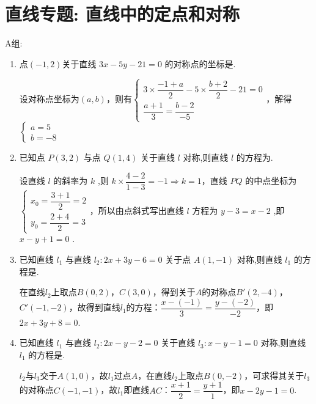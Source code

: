 \section*{直线专题: 直线中的定点和对称}

A组:

\begin{enumerate}
    \item 点$(-1,2)$关于直线 ${3x} - {5y} - {21} = 0$ 的对称点的坐标是.
    \begin{jieda}
        设对称点坐标为$(a, b)$，则有$\left\{\begin{array}{l}
             3 \times \dfrac{-1+a}{2} - 5 \times \dfrac{b+2}{2} - {21} = 0 \\
             \dfrac{a+1}{3} = \dfrac{b-2}{-5}
        \end{array}\right.$，解得$\left\{\begin{array}{l}
             a = 5  \\
             b = -8
        \end{array}\right.$
    \end{jieda}
    
    \item 已知点 $P\left( {3,2}\right)$ 与点 $Q\left( {1,4}\right)$ 关于直线 $l$ 对称,则直线 $l$ 的方程为.
    \begin{jieda}
        设直线 $l$ 的斜率为 $k$ ,则 $k \times  \dfrac{4 - 2}{1 - 3} =  - 1 \Longrightarrow  k = 1$，直线 ${PQ}$ 的中点坐标为 $\left\{  \begin{array}{l} {x}_{0} = \dfrac{3 + 1}{2} = 2 \\  {y}_{0} = \dfrac{2 + 4}{2} = 3 \end{array}\right.$，所以由点斜式写出直线 $l$ 方程为 $y - 3 = x - 2$ ,即 $x - y + 1 = 0$ .
    \end{jieda}
    
    \item 已知直线 ${l}_{1}$ 与直线 ${l}_{2} : {2x} + {3y} - 6 = 0$ 关于点 $A\left( {1, - 1}\right)$ 对称,则直线 ${l}_{1}$ 的方程是.
    \begin{jieda}
        在直线$l_2$上取点$B(0,2)$，$C(3, 0)$，得到关于$A$的对称点$B'(2, -4)$，$C'(-1, -2)$，故得到直线$l_1$的方程：$\dfrac{x-(-1)}{3} = \dfrac{y-(-2)}{-2}$，即$2x+3y+8=0$.
    \end{jieda}
    
    \item 已知直线 ${l}_{1}$ 与直线 ${l}_{2} : {2x} - y - 2 = 0$ 关于直线 ${l}_{3} : x - y - 1 = 0$ 对称,则直线 ${l}_{1}$ 的方程是.
    \begin{jieda}
        $l_2$与$l_3$交于$A(1, 0)$，故$l_1$过点$A$，在直线$l_2$上取点$B(0, -2)$，可求得其关于$l_3$的对称点$C(-1, -1)$，故$l_1$即直线$AC$：$\dfrac{x+1}{2} = \dfrac{y+1}{1}$，即$x-2y-1=0$.
    \end{jieda}
    

\end{enumerate}
